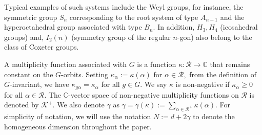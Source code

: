 \documentclass[a4paper,11pt, reqno]{amsart}
\theoremstyle{definition}
\theoremstyle{remark}
\numberwithin{equation}{section}
\begin{document}
	Typical examples of such systems include the Weyl groups, for instance, the symmetric group  $S_{n}$ corresponding to the root system of type  $A_{n-1}$ and the hyperoctahedral group associated with type $B_{n}$. In addition, $H_{3}, H_{4}$ (icosahedral groups) and, $I_{2}(n)$ (symmetry group of the regular $n$-gon)  also belong to the class of Coxeter groups.
	
	A multiplicity function associated with
$G$ is a function $\kappa: \mathcal{R} \rightarrow \mathbb{C}$ that remains constant on the $G$-orbits. Setting $\kappa_{\alpha}:=\kappa(\alpha)$ for $\alpha \in \mathcal{R},$  from the definition of $G$-invariant,  we have $\kappa_{g \alpha}=\kappa_{\alpha}$ for all $g \in G$.  We say $\kappa$ is non-negative if $\kappa_{\alpha} \geq 0$ for all $\alpha \in \mathcal{R}$. The $\mathbb{C}$-vector space of non-negative multiplicity functions on $\mathcal{R}$ is denoted by $\mathcal{K}^{+}$. We also  denote  $\gamma$ as $\gamma=\gamma(\kappa):=\sum\limits_{\alpha\in\mathcal{R}^+}\kappa(\alpha)$. For simplicity of notation, we will use the notation  $N:=d+2\gamma$ to denote the homogeneous dimension throughout the paper. 
	
\end{document}
